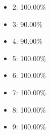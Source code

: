 \begin{frame}
\begin{columns}
\begin{column}{0.5\textwidth}
\begin{itemize}
                \item 2: 100.00\%
                \item 3: 90.00\%
                \item 4: 90.00\%
                \item 5: 100.00\%
                \item 6: 100.00\%
                \item 7: 100.00\%
                \item 8: 100.00\%
                \item 9: 100.00\%
            \end{itemize}
        \end{column}
    \end{columns}
\end{frame}

